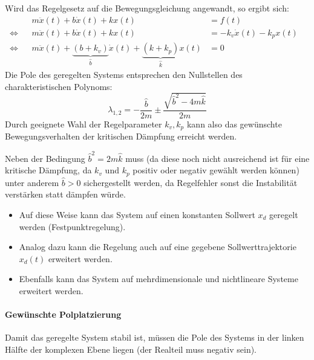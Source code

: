 				Wird das Regelgesetz auf die Bewegungsgleichung angewandt, so ergibt sich:
				\begin{align*}
					     &  & m\ddot{x}(t) + b\dot{x}(t) + kx(t)                                                                 & = f(t)                       &  \\
					\iff &  & m\ddot{x}(t) + b\dot{x}(t) + kx(t)                                                                 & = -k_v \dot{x}(t) - k_p x(t) &  \\
					\iff &  & m\ddot{x}(t) + \underbrace{(b + k_v)}_{\hat{b}} \dot{x}(t) + \underbrace{(k + k_p)}_{\hat{k}} x(t) & = 0                          &
				\end{align*}
				Die Pole des geregelten Systems entsprechen den Nullstellen des charakteristischen Polynoms:
				\begin{equation*}
					\lambda_{1, 2} = -\frac{\hat{b}}{2m} \pm \frac{\sqrt{\hat{b}^2 - 4m\hat{k}}}{2m}
				\end{equation*}
				Durch geeignete Wahl der Regelparameter \( k_v, k_p \) kann also das gewünschte Bewegungsverhalten der kritischen Dämpfung erreicht werden.

				Neben der Bedingung \( \hat{b}^2 = 2m\hat{k} \) muss (da diese noch nicht ausreichend ist für eine kritische Dämpfung, da \( k_v \) und \( k_p \) positiv oder negativ gewählt werden können) unter anderem \( \hat{b} > 0 \) sichergestellt werden, da Regelfehler sonst die Instabilität verstärken statt dämpfen würde.

				\begin{itemize}
					\item Auf diese Weise kann das System auf einen konstanten Sollwert \( x_d \) geregelt werden (Festpunktregelung).
					\item Analog dazu kann die Regelung auch auf eine gegebene Sollwerttrajektorie \( x_d(t) \) erweitert werden.
					\item Ebenfalls kann das System auf mehrdimensionale und nichtlineare Systeme erweitert werden.
				\end{itemize}

				\paragraph{Gewünschte Polplatzierung}
					Damit das geregelte System stabil ist, müssen die Pole des Systems in der linken Hälfte der komplexen Ebene liegen (\dh der Realteil muss negativ sein).

